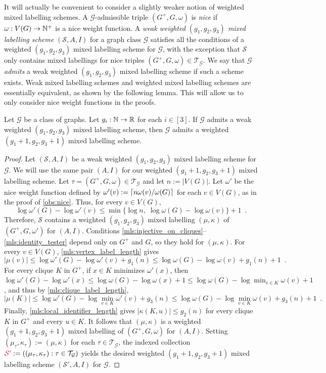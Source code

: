 \documentclass{patmorin}
\makeatletter
\renewcommand{\le}{\leqslant}
\renewcommand{\leq}{\leqslant}
\newcommand{\defin}[1]{\emph{\textcolor{brightmaroon}{#1}}}
\def\mathcolor#1#{\@mathcolor{#1}}
\def\@mathcolor#1#2#3{%
  \protect\leavevmode
  \begingroup
    \color#1{#2}#3%
  \endgroup
}
\newcommand{\mathdefin}[1]{\mathcolor{brightmaroon}{#1}}
\DeclarePairedDelimiter{\ceil}{\lceil}{\rceil}
\newcommand{\calG}{\mathcal{G}}
\newcommand{\calS}{\mathcal{S}}
\newcommand{\calT}{\mathcal{T}}
\makeatother
\begin{document}
It will actually be convenient to consider a slightly weaker notion of weighted mixed labelling schemes.  A $\calG$-admissible triple $(G^+,G,\omega)$ is \defin{nice} if $\omega:V(G)\to\mathbb{N}^+$ is a nice weight function.  A \defin{weak weighted $(g_1,g_2,g_3)$ mixed labelling scheme} $(\calS,A,I)$ for a graph class $\calG$ satisfies all the conditions of a weighted $(g_1,g_2,g_3)$ mixed labelling scheme for $\calG$, with the exception that $\calS$ only contains mixed labellings for nice triples $(G^+,G,\omega)\in\calT_\calG$. 
We say that $\calG$ \defin{admits} a weak weighted $(g_1,g_2,g_3)$ mixed labelling scheme if such a scheme exists. Weak mixed labelling schemes and weighted mixed labelling schemes are essentially equivalent, as shown by the following lemma. This will allow us to only consider nice weight functions in the proofs.

\begin{lem}
  \label{lem:nice_weights}
  Let $\calG$ be a class of graphs.
  Let $g_i:\mathbb{N}\to\mathbb{R}$ for each $i\in[3]$.
  If $\calG$ admits a weak weighted $(g_1,g_2,g_3)$ mixed labelling scheme, then $\calG$ admits a weighted $(g_1+1,g_2,g_3+1)$ mixed labelling scheme.
\end{lem}
\begin{proof}
  Let $(\calS,A,I)$ be a weak weighted $(g_1,g_2,g_3)$ mixed labelling scheme for $\calG$. We will use the same pair $(A, I)$ for our weighted $(g_1+1,g_2,g_3+1)$ mixed labelling scheme. Let $\tau=(G^+,G,\omega)\in\calT_\calG$ and let $n:=|V(G)|$. Let $\omega'$ be the nice weight function defined by $\omega'(v):=\ceil{n\omega(v)/\omega(G)}$ for each $v\in V(G)$, as in the proof of \cref{obs:nice}. Thus, for every $v\in V(G)$,
  \[
    \log\omega'(G)-\log\omega'(v)\le\min\{\log n,\;\log\omega(G)-\log\omega(v)\}+1 \enspace.
  \]
  Therefore, $\calS$ contains a weighted $(g_1,g_2,g_3)$ mixed labelling $(\mu,\kappa)$ of $(G^+,G,\omega')$ for $(A,I)$.
  Conditions \ref{mls:injective_on_cliques}--\ref{mls:identity_tester} depend only on $G^+$ and $G$, so they hold for $(\mu,\kappa)$. For every $v\in V(G)$, \ref{mls:vertex_label_length} gives
  \[
    |\mu(v)| \leq \log \omega'(G) - \log\omega'(v) + g_1(n) \leq \log \omega(G) - \log\omega(v) + g_1(n) + 1\enspace.
  \]
  For every clique $K$ in $G^+$, if $x\in K$ minimizes $\omega'(x)$, then $\log\omega'(G)-\log\omega'(x) \le \log\omega(G)-\log\omega(x)+1 \le \log\omega(G)-\log\min_{v\in K}\omega(v)+1$, and thus by \ref{mls:clique_label_length},
  \[
    |\mu(K)|\le \log \omega'(G) - \log\min_{v\in K}\omega'(v) + g_3(n)
    \leq \log \omega(G) - \log\min_{v\in K}\omega(v) + g_3(n) + 1\enspace.
  \]
  Finally, \ref{mls:local_identifier_length} gives $|\kappa(K,u)|\le g_2(n)$ for every clique $K$ in $G^+$ and every $u\in K$. It follows that $(\mu,\kappa)$ is a weighted $(g_1+1,g_2,g_3+1)$ mixed labelling of $(G^+,G,\omega)$ for $(A,I)$. Setting $(\mu_\tau,\kappa_\tau) := (\mu,\kappa)$ for each $\tau\in\calT_\calG$, the indexed collection $\mathdefin{\calS'}:=((\mu_\tau,\kappa_\tau):\tau\in\calT_\calG)$ yields the desired weighted $(g_1+1,g_2,g_3+1)$ mixed labelling scheme $(\calS',A,I)$ for $\calG$.
\end{proof}
\end{document}
